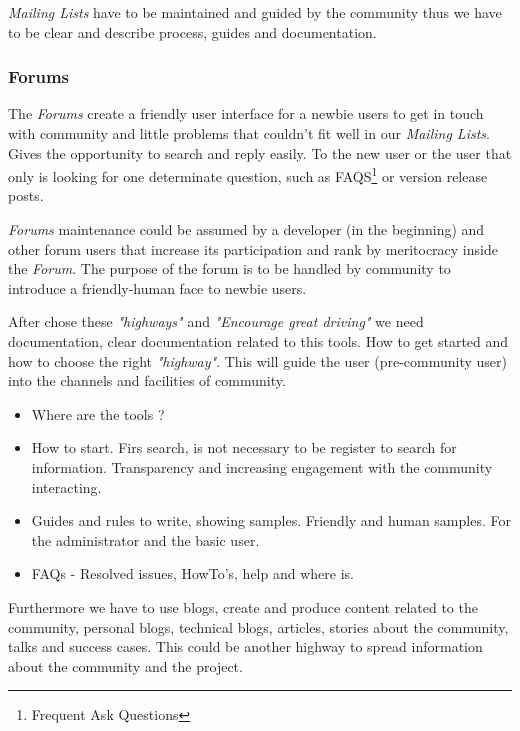 \documentclass[11pt]{scrartcl}
\begin{document}
\par \emph{Mailing Lists} have to be maintained and guided by the community thus we have to be clear and describe process, guides and documentation.

\subsubsection{Forums}
\label{sub:forums}

\par The \emph{Forums} create a friendly user interface for a newbie users to get in touch with community and little problems that couldn't fit well in our \emph{Mailing Lists}. Gives the opportunity to search and reply easily. To the new user or the user that only is looking for one determinate question, such as FAQS\footnote{Frequent Ask Questions} or version release posts.

\par \emph{Forums} maintenance could be assumed by a developer (in the beginning) and other forum users that increase its participation and rank by meritocracy inside the \emph{Forum}. The purpose of the forum is to be handled by community to introduce a friendly-human face to newbie users.


\par After chose these \emph{"highways"} and \emph{"Encourage great driving"} we need documentation, clear documentation related to this tools. How to get started and how to choose the right \emph{"highway"}. This will guide the user (pre-community user) into the channels and facilities of community. 

\begin{itemize}
	\item Where are the tools ?
	\item How to start. Firs search, is not necessary to be register to search for information. Transparency and increasing engagement with the community interacting.
	\item Guides and rules to write, showing samples. Friendly and human samples. For the administrator and the basic user.
	\item FAQs - Resolved issues, HowTo's, help and where is.
\end{itemize}

\par Furthermore we have to use blogs, create and produce content related to the community, personal blogs, technical blogs, articles, stories about the community, talks and success cases. This could be another highway to spread information about the community and the project.
\end{document}
